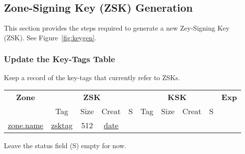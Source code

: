 
\clearpage
\subsection{Zone-Signing Key (ZSK) Generation}
\label{genzsk}

This section provides the steps required to generate a new Zey-Signing Key   
(ZSK).  See Figure~\ref{fig:keygen}.





\subsubsection{Update the Key-Tags Table}

Keep a record of the key-tags that currently refer to ZSKs.

\begin{center}
\begin{tabular}{|c|c|c|c|c|c|c|c|c|c|}
\hline
{\bf Zone} &
\multicolumn{4}{c|}{{\bf ZSK}} &
\multicolumn{4}{c|}{{\bf KSK}} &
{\bf Exp} \\
\cline{2-9}

 & Tag & Size & Creat & S & Tag & Size & Creat & S & \\
\hline

\underline{zone.name} & \underline{zsktag} & 512 & \underline{date} & & & & & & \\

\hline
\end{tabular}
\end{center}

Leave the status field (S) empty for now.




